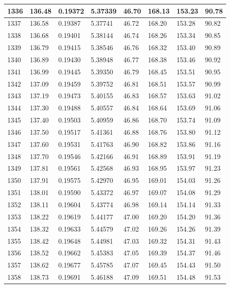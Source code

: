 \documentclass[12pt,a4paper,twoside]{article}
\begin{document}
\begin{center}
\begin{longtable}{l l l l | l l l l}
1336 & 136.48 & 0.19372 & 5.37339 & 46.70 & 168.13 & 153.23 & 90.78 \\ \hline
1337 & 136.58 & 0.19387 & 5.37741 & 46.72 & 168.20 & 153.28 & 90.82 \\ \hline
1338 & 136.68 & 0.19401 & 5.38144 & 46.74 & 168.26 & 153.34 & 90.85 \\ \hline
1339 & 136.79 & 0.19415 & 5.38546 & 46.76 & 168.32 & 153.40 & 90.89 \\ \hline
1340 & 136.89 & 0.19430 & 5.38948 & 46.77 & 168.38 & 153.46 & 90.92 \\ \hline
1341 & 136.99 & 0.19445 & 5.39350 & 46.79 & 168.45 & 153.51 & 90.95 \\ \hline
1342 & 137.09 & 0.19459 & 5.39752 & 46.81 & 168.51 & 153.57 & 90.99 \\ \hline
1343 & 137.19 & 0.19473 & 5.40155 & 46.83 & 168.57 & 153.63 & 91.02 \\ \hline
1344 & 137.30 & 0.19488 & 5.40557 & 46.84 & 168.64 & 153.69 & 91.06 \\ \hline
1345 & 137.40 & 0.19503 & 5.40959 & 46.86 & 168.70 & 153.74 & 91.09 \\ \hline
1346 & 137.50 & 0.19517 & 5.41361 & 46.88 & 168.76 & 153.80 & 91.12 \\ \hline
1347 & 137.60 & 0.19531 & 5.41763 & 46.90 & 168.82 & 153.86 & 91.16 \\ \hline
1348 & 137.70 & 0.19546 & 5.42166 & 46.91 & 168.89 & 153.91 & 91.19 \\ \hline
1349 & 137.81 & 0.19561 & 5.42568 & 46.93 & 168.95 & 153.97 & 91.23 \\ \hline
1350 & 137.91 & 0.19575 & 5.42970 & 46.95 & 169.01 & 154.03 & 91.26 \\ \hline
1351 & 138.01 & 0.19590 & 5.43372 & 46.97 & 169.07 & 154.08 & 91.29 \\ \hline
1352 & 138.11 & 0.19604 & 5.43774 & 46.98 & 169.14 & 154.14 & 91.33 \\ \hline
1353 & 138.22 & 0.19619 & 5.44177 & 47.00 & 169.20 & 154.20 & 91.36 \\ \hline
1354 & 138.32 & 0.19633 & 5.44579 & 47.02 & 169.26 & 154.26 & 91.39 \\ \hline
1355 & 138.42 & 0.19648 & 5.44981 & 47.03 & 169.32 & 154.31 & 91.43 \\ \hline
1356 & 138.52 & 0.19662 & 5.45383 & 47.05 & 169.39 & 154.37 & 91.46 \\ \hline
1357 & 138.62 & 0.19677 & 5.45785 & 47.07 & 169.45 & 154.43 & 91.50 \\ \hline
1358 & 138.73 & 0.19691 & 5.46188 & 47.09 & 169.51 & 154.48 & 91.53 \\ \hline

\end{longtable}
\end{center}
\end{document}
